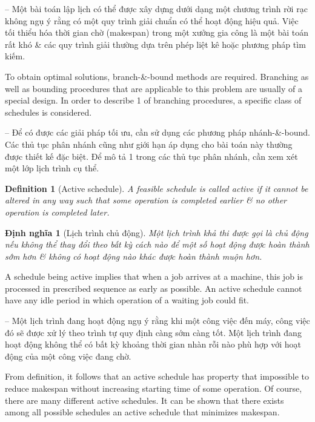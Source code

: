 \documentclass{article}
\newtheorem{definition}{Definition}
\newtheorem{dinhnghia}{Định nghĩa}
\begin{document}
\begin{itemize}
\begin{itemize}
        -- Một bài toán lập lịch có thể được xây dựng dưới dạng một chương trình rời rạc không ngụ ý rằng có một quy trình giải chuẩn có thể hoạt động hiệu quả. Việc tối thiểu hóa thời gian chờ (makespan) trong một xưởng gia công là một bài toán rất khó \& các quy trình giải thường dựa trên phép liệt kê hoặc phương pháp tìm kiếm.

        To obtain optimal solutions, branch-\&-bound methods are required. Branching as well as bounding procedures that are applicable to this problem are usually of a special design. In order to describe 1 of branching procedures, a specific class of schedules is considered.

        -- Để có được các giải pháp tối ưu, cần sử dụng các phương pháp nhánh-\&-bound. Các thủ tục phân nhánh cũng như giới hạn áp dụng cho bài toán này thường được thiết kế đặc biệt. Để mô tả 1 trong các thủ tục phân nhánh, cần xem xét một lớp lịch trình cụ thể.

        \begin{definition}[Active schedule]
            A feasible schedule is called {\rm active} if it cannot be altered in any way such that some operation is completed earlier \& no other operation is completed later.
        \end{definition}

        \begin{dinhnghia}[Lịch trình chủ động]
            Một lịch trình khả thi được gọi là chủ động nếu không thể thay đổi theo bất kỳ cách nào để một số hoạt động được hoàn thành sớm hơn \& không có hoạt động nào khác được hoàn thành muộn hơn.
        \end{dinhnghia}
        A schedule being active implies that when a job arrives at a machine, this job is processed in prescribed sequence as early as possible. An active schedule cannot have any idle period in which operation of a waiting job could fit.

        -- Một lịch trình đang hoạt động ngụ ý rằng khi một công việc đến máy, công việc đó sẽ được xử lý theo trình tự quy định càng sớm càng tốt. Một lịch trình đang hoạt động không thể có bất kỳ khoảng thời gian nhàn rỗi nào phù hợp với hoạt động của một công việc đang chờ.

        From definition, it follows that an active schedule has property that impossible to reduce makespan without increasing starting time of some operation. Of course, there are many different active schedules. It can be shown that there exists among all possible schedules an active schedule that minimizes makespan.


\end{itemize}
\end{itemize}
\end{document}
